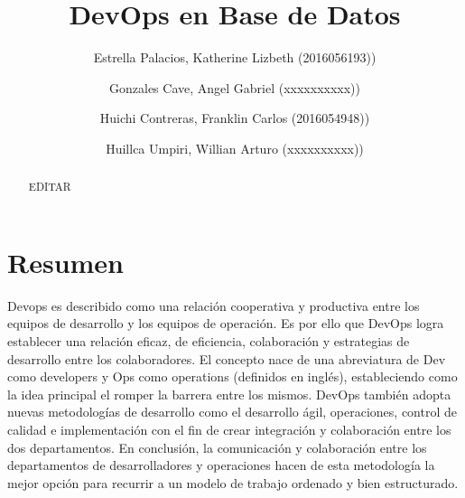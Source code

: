 \documentclass[preprint,12pt]{elsarticle}
\begin{document}
	
	\begin{frontmatter}

		\title{\huge DevOps en Base de Datos}
		
		\author{Estrella Palacios, Katherine Lizbeth              	(2016056193))}
		\author{Gonzales Cave, Angel Gabriel              	(xxxxxxxxxx))} %
		\author{Huichi Contreras, Franklin Carlos         	(2016054948))} %
		\author{Huillca Umpiri, Willian Arturo             		(xxxxxxxxxx))} %
		\address{Tacna, Perú}
		

		\begin{abstract}
		
EDITAR

		\end{abstract}


	\end{frontmatter}


	\section{Resumen}

Devops es describido como una relación cooperativa y productiva entre los equipos de desarrollo y los equipos de operación. Es por ello que DevOps logra establecer una relación eficaz, de eficiencia, colaboración y estrategias de desarrollo entre los colaboradores.
El concepto nace de una abreviatura de Dev como developers y Ops como operations (definidos en inglés), estableciendo como la idea principal el romper la barrera entre los mismos. 
DevOps también adopta nuevas metodologías de desarrollo como el desarrollo ágil, operaciones, control de calidad e implementación con el fin de crear integración y colaboración entre los dos departamentos.
En conclusión, la comunicación y colaboración entre los departamentos de desarrolladores y operaciones hacen de esta metodología la mejor opción para recurrir a un modelo de trabajo ordenado y bien estructurado.

\end{document}
